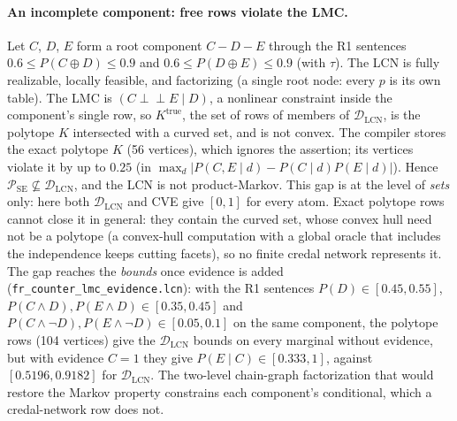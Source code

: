 \documentclass{article} %
\newcommand{\indep}{\perp\!\!\!\perp}
\newcommand{\DLCN}{\mathcal{D}_{\mathrm{LCN}}}
\begin{document}
\paragraph{An incomplete component: free rows violate the LMC.}
Let $C$, $D$, $E$ form a root component $C - D - E$ through the R1 sentences
$0.6\le P(C\oplus D)\le0.9$ and $0.6\le P(D\oplus E)\le0.9$ (with $\tau$). The LCN is fully
realizable, locally feasible, and factorizing (a single root node: every $p$ is its own table). The
LMC is $(C\indep E\mid D)$, a nonlinear constraint inside the component's single row, so
$K^{\mathrm{true}}$, the set of rows of members of $\DLCN$, is the polytope $K$ intersected with a
curved set, and is not convex. The compiler stores the exact polytope $K$ (56 vertices), which ignores
the assertion; its vertices violate it by up to $0.25$ (in
$\max_d|P(C,E\mid d)-P(C\mid d)P(E\mid d)|$). Hence $\mathcal P_{\mathrm{SE}}\not\subseteq\DLCN$, and the
LCN is not product-Markov. This gap is at the level of \emph{sets} only: here both $\DLCN$ and CVE give
$[0,1]$ for every atom. Exact polytope rows cannot close it in general: they contain the curved set,
whose convex hull need not be a polytope (a convex-hull computation with a global oracle that
includes the independence keeps cutting facets), so no finite credal network represents it. The gap
reaches the \emph{bounds} once evidence is added
(\texttt{fr\_counter\_lmc\_evidence.lcn}): with the R1 sentences $P(D)\in[0.45,0.55]$,
$P(C\wedge D),P(E\wedge D)\in[0.35,0.45]$ and $P(C\wedge\lnot D),P(E\wedge\lnot D)\in[0.05,0.1]$ on the
same component, the polytope rows (104 vertices) give the $\DLCN$ bounds on every marginal without
evidence, but with evidence $C{=}1$ they give $P(E\mid C)\in[0.333,1]$, against $[0.5196,0.9182]$ for
$\DLCN$. The two-level chain-graph factorization that would restore the Markov property
\citep{lauritzen96} constrains each component's conditional, which a credal-network row does not.
\end{document}
